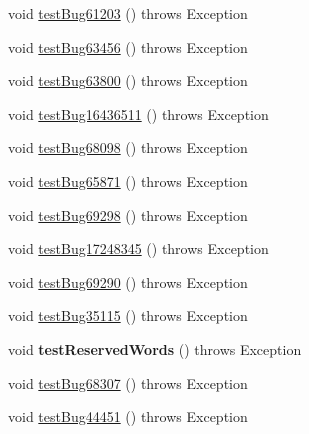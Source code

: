 \begin{DoxyCompactItemize}
\item 
void \mbox{\hyperlink{classtestsuite_1_1regression_1_1_meta_data_regression_test_a0dd9e6de4ad836964f235a4a27aed144}{test\+Bug61203}} ()  throws Exception 
\item 
void \mbox{\hyperlink{classtestsuite_1_1regression_1_1_meta_data_regression_test_a8d8e4af7ca8136d86aa2ea60237ceb89}{test\+Bug63456}} ()  throws Exception 
\item 
void \mbox{\hyperlink{classtestsuite_1_1regression_1_1_meta_data_regression_test_af38b67a5bf6e3396cd891b3f8b4d2c8f}{test\+Bug63800}} ()  throws Exception 
\item 
void \mbox{\hyperlink{classtestsuite_1_1regression_1_1_meta_data_regression_test_a1fd3d694ae818586b9e77cceb5bfbbb3}{test\+Bug16436511}} ()  throws Exception 
\item 
void \mbox{\hyperlink{classtestsuite_1_1regression_1_1_meta_data_regression_test_a70f7534e3db316950ae32e2142e9ade2}{test\+Bug68098}} ()  throws Exception 
\item 
void \mbox{\hyperlink{classtestsuite_1_1regression_1_1_meta_data_regression_test_a8cde8eefe9689a7113484b6de4827afd}{test\+Bug65871}} ()  throws Exception 
\item 
void \mbox{\hyperlink{classtestsuite_1_1regression_1_1_meta_data_regression_test_a1367bf2ebe3a308c3d374e28648699fc}{test\+Bug69298}} ()  throws Exception 
\item 
void \mbox{\hyperlink{classtestsuite_1_1regression_1_1_meta_data_regression_test_a5eb8eb8d010b18e3193a85380d5483ba}{test\+Bug17248345}} ()  throws Exception 
\item 
void \mbox{\hyperlink{classtestsuite_1_1regression_1_1_meta_data_regression_test_a415c490c795a8501bb347c435a223360}{test\+Bug69290}} ()  throws Exception 
\item 
void \mbox{\hyperlink{classtestsuite_1_1regression_1_1_meta_data_regression_test_a73c2bf687084e2bc8c33f56cce84bdbf}{test\+Bug35115}} ()  throws Exception 
\item 
\mbox{\label{classtestsuite_1_1regression_1_1_meta_data_regression_test_af85d61fc6d842052ba712ccdda0fd77a}} 
void {\bfseries test\+Reserved\+Words} ()  throws Exception 
\item 
void \mbox{\hyperlink{classtestsuite_1_1regression_1_1_meta_data_regression_test_a7546dce3979e1d5f2f28703337b00e62}{test\+Bug68307}} ()  throws Exception 
\item 
void \mbox{\hyperlink{classtestsuite_1_1regression_1_1_meta_data_regression_test_ad048c86a8dc4f574eae4004473ceaa6f}{test\+Bug44451}} ()  throws Exception 

\end{DoxyCompactItemize}
